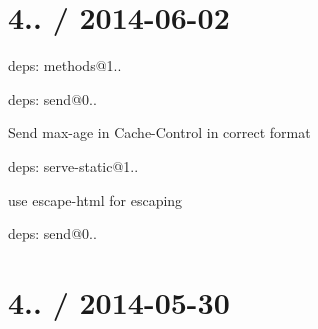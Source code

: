 {\ttfamily \section*{4.. / 2014-\/06-\/02 }}

{\ttfamily }

{\ttfamily 
\begin{DoxyItemize}
\item deps\+: methods@1..
\item deps\+: send@0..
\begin{DoxyItemize}
\item Send {\ttfamily max-\/age} in {\ttfamily Cache-\/\+Control} in correct format
\end{DoxyItemize}
\item deps\+: serve-\/static@1..
\begin{DoxyItemize}
\item use {\ttfamily escape-\/html} for escaping
\item deps\+: send@0..
\end{DoxyItemize}
\end{DoxyItemize}}

{\ttfamily \section*{4.. / 2014-\/05-\/30 }}

{\ttfamily }

